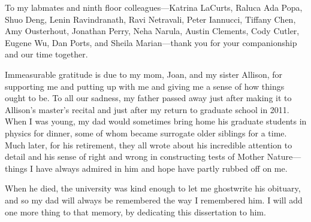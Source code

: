 To my labmates and ninth floor colleagues---Katrina LaCurts, Raluca
Ada Popa, Shuo Deng, Lenin Ravindranath, Ravi Netravali, Peter
Iannucci, Tiffany Chen, Amy Ousterhout, Jonathan Perry, Neha Narula,
Austin Clements, Cody Cutler, Eugene Wu, Dan Ports, and Sheila
Marian---thank you for your companionship and our time together.

Immeasurable gratitude is due to my mom, Joan, and my sister Allison,
for supporting me and putting up with me and giving me a sense of how
things ought to be. To all our sadness, my father passed away just
after making it to Allison's master's recital and just after my return
to graduate school in 2011. When I was young, my dad would sometimes
bring home his graduate students in physics for dinner, some of whom
became surrogate older siblings for a time. Much later, for his
retirement, they all wrote about his incredible attention to detail
and his sense of right and wrong in constructing tests of Mother
Nature---things I have always admired in him and hope have partly
rubbed off on me.

When he died, the university was kind enough to let me ghostwrite his
obituary, and so my dad will always be remembered the way I remembered
him. I will add one more thing to that memory, by dedicating this
dissertation to him.
